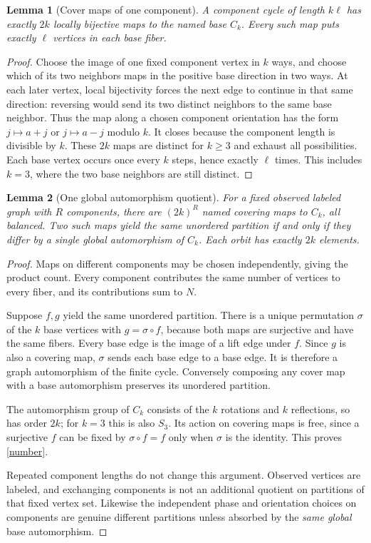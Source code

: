 \documentclass[11pt]{article}
\newtheorem{lemma}{Lemma}
\begin{document}
\begin{lemma}[Cover maps of one component]
A component cycle of length $k\ell$ has exactly $2k$ locally bijective
maps to the named base $C_k$. Every such map puts exactly $\ell$ vertices
in each base fiber.
\end{lemma}
\begin{proof}
Choose the image of one fixed component vertex in $k$ ways, and choose
which of its two neighbors maps in the positive base direction in two
ways. At each later vertex, local bijectivity forces the next edge to
continue in that same direction: reversing would send its two distinct
neighbors to the same base neighbor. Thus the map along a chosen
component orientation has the form $j\mapsto a+j$ or $j\mapsto a-j$
modulo $k$. It closes because the component length is divisible by $k$.
These $2k$ maps are distinct for $k\geq3$ and exhaust all possibilities.
Each base vertex occurs once every $k$ steps, hence exactly $\ell$ times.
This includes $k=3$, where the two base neighbors are still distinct.
\end{proof}

\begin{lemma}[One global automorphism quotient]
For a fixed observed labeled graph with $R$ components, there are
$(2k)^R$ named covering maps to $C_k$, all balanced. Two such maps yield
the same unordered partition if and only if they differ by a single
global automorphism of $C_k$. Each orbit has exactly $2k$ elements.
\end{lemma}
\begin{proof}
Maps on different components may be chosen independently, giving the
product count. Every component contributes the same number of vertices
to every fiber, and its contributions sum to $N$.

Suppose $f,g$ yield the same unordered partition. There is a unique
permutation $\sigma$ of the $k$ base vertices with $g=\sigma\circ f$,
because both maps are surjective and have the same fibers. Every base
edge is the image of a lift edge under $f$. Since $g$ is also a covering
map, $\sigma$ sends each base edge to a base edge. It is therefore a
graph automorphism of the finite cycle. Conversely composing any cover
map with a base automorphism preserves its unordered partition.

The automorphism group of $C_k$ consists of the $k$ rotations and $k$
reflections, so has order $2k$; for $k=3$ this is also $S_3$. Its action
on covering maps is free, since a surjective $f$ can be fixed by
$\sigma\circ f=f$ only when $\sigma$ is the identity. This proves
\eqref{number}.

Repeated component lengths do not change this argument. Observed vertices
are labeled, and exchanging components is not an additional quotient on
partitions of that fixed vertex set. Likewise the independent phase and
orientation choices on components are genuine different partitions
unless absorbed by the \emph{same global} base automorphism.
\end{proof}
\end{document}
